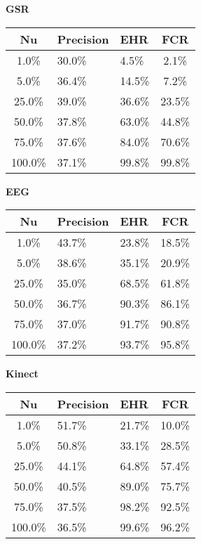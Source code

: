 \begin{table}[H]
  \centering
  \textbf{GSR}\vspace{2pt}
  \begin{tabularx}{\columnwidth}{cXXc}
    \toprule
    \textbf{Nu} & \textbf{Precision} & \textbf{EHR} & \textbf{FCR} \\
    \midrule
    1.0\% & 30.0\% & 4.5\% & 2.1\% \\ \hline
    5.0\% & 36.4\% & 14.5\% & 7.2\% \\ \hline
    25.0\% & 39.0\% & 36.6\% & 23.5\% \\ \hline
    50.0\% & 37.8\% & 63.0\% & 44.8\% \\ \hline
    75.0\% & 37.6\% & 84.0\% & 70.6\% \\ \hline
    100.0\% & 37.1\% & 99.8\% & 99.8\% \\ \hline
    \bottomrule
  \end{tabularx}

  \vspace{4pt}

  \textbf{EEG}\vspace{2pt}
  \begin{tabularx}{\columnwidth}{cXXc}
    \toprule
    \textbf{Nu} & \textbf{Precision} & \textbf{EHR} & \textbf{FCR} \\
    \midrule
    1.0\% & 43.7\% & 23.8\% & 18.5\% \\ \hline
    5.0\% & 38.6\% & 35.1\% & 20.9\% \\ \hline
    25.0\% & 35.0\% & 68.5\% & 61.8\% \\ \hline
    50.0\% & 36.7\% & 90.3\% & 86.1\% \\ \hline
    75.0\% & 37.0\% & 91.7\% & 90.8\% \\ \hline
    100.0\% & 37.2\% & 93.7\% & 95.8\% \\ \hline
    \bottomrule
  \end{tabularx}

  \vspace{4pt}

  \textbf{Kinect}\vspace{2pt}
  \begin{tabularx}{\columnwidth}{cXXc}
    \toprule
    \textbf{Nu} & \textbf{Precision} & \textbf{EHR} & \textbf{FCR} \\
    \midrule
    1.0\% & 51.7\% & 21.7\% & 10.0\% \\ \hline
    5.0\% & 50.8\% & 33.1\% & 28.5\% \\ \hline
    25.0\% & 44.1\% & 64.8\% & 57.4\% \\ \hline
    50.0\% & 40.5\% & 89.0\% & 75.7\% \\ \hline
    75.0\% & 37.5\% & 98.2\% & 92.5\% \\ \hline
    100.0\% & 36.5\% & 99.6\% & 96.2\% \\ \hline
    \bottomrule
  \end{tabularx}


\end{table}
